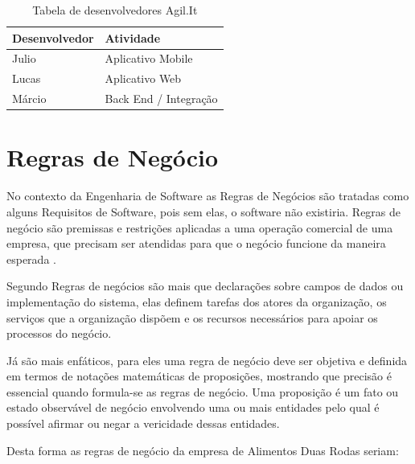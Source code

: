 \begin{table}[H]
	\centering
	\caption{\label{tabela_desenvolvedores}Tabela de desenvolvedores Agil.It}
	\begin{tabular}{|l|l|}
		\hline
		\textbf{Desenvolvedor} & \textbf{Atividade}    \\ \hline
		Julio                  & Aplicativo Mobile     \\ \hline
		Lucas                  & Aplicativo Web        \\ \hline
		Márcio                 & Back End / Integração \\ \hline
	\end{tabular}
\end{table}



\section{Regras de Negócio}
No contexto da Engenharia de Software as Regras de Negócios são tratadas como alguns Requisitos de Software, pois sem elas, o software não existiria. Regras de negócio são premissas e restrições aplicadas a uma operação comercial de uma empresa, que precisam ser atendidas para que o negócio funcione da maneira esperada \cite{crerie2008identificacao}.

Segundo \cite{2001SilviaInes} Regras de negócios são mais que declarações sobre campos de dados ou implementação do sistema, elas definem tarefas dos atores da organização, os serviços que a organização dispõem e os recursos necessários para apoiar os processos do negócio.

Já \cite{1997kilovSimmonds} são mais enfáticos, para eles uma regra de negócio deve ser objetiva e definida em termos de notações matemáticas de proposições, mostrando que precisão é essencial quando formula-se as regras de negócio. Uma proposição é um fato ou estado observável de negócio envolvendo uma ou mais entidades pelo qual é possível afirmar ou negar a vericidade dessas entidades.

Desta forma as regras de negócio da empresa de Alimentos Duas Rodas seriam:


